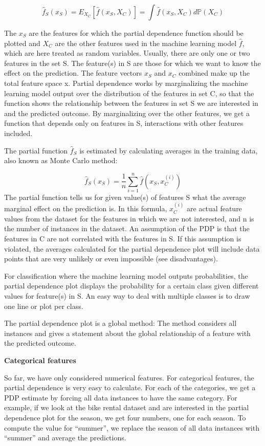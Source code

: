 \documentclass[
  10pt,
]{scrbook}
\begin{document}
\[\hat{f}_S(x_S)=E_{X_C}\left[\hat{f}(x_S,X_C)\right]=\int\hat{f}(x_S,X_C)d\mathbb{P}(X_C)\]

The \(x_S\) are the features for which the partial dependence function should be plotted and \(X_C\) are the other features used in the machine learning model \(\hat{f}\), which are here treated as random variables.
Usually, there are only one or two features in the set S.
The feature(s) in S are those for which we want to know the effect on the prediction.
The feature vectors \(x_S\) and \(x_C\) combined make up the total feature space x.
Partial dependence works by marginalizing the machine learning model output over the distribution of the features in set C, so that the function shows the relationship between the features in set S we are interested in and the predicted outcome.
By marginalizing over the other features, we get a function that depends only on features in S, interactions with other features included.

The partial function \(\hat{f}_S\) is estimated by calculating averages in the training data, also known as Monte Carlo method:

\[\hat{f}_S(x_S)=\frac{1}{n}\sum_{i=1}^n\hat{f}(x_S,x^{(i)}_{C})\]
The partial function tells us for given value(s) of features S what the average marginal effect on the prediction is.
In this formula, \(x^{(i)}_{C}\) are actual feature values from the dataset for the features in which we are not interested, and n is the number of instances in the dataset.
An assumption of the PDP is that the features in C are not correlated with the features in S.
If this assumption is violated, the averages calculated for the partial dependence plot will include data points that are very unlikely or even impossible (see disadvantages).

For classification where the machine learning model outputs probabilities, the partial dependence plot displays the probability for a certain class given different values for feature(s) in S.
An easy way to deal with multiple classes is to draw one line or plot per class.

The partial dependence plot is a global method:
The method considers all instances and gives a statement about the global relationship of a feature with the predicted outcome.

\textbf{Categorical features}

So far, we have only considered numerical features.
For categorical features, the partial dependence is very easy to calculate.
For each of the categories, we get a PDP estimate by forcing all data instances to have the same category.
For example, if we look at the bike rental dataset and are interested in the partial dependence plot for the season, we get four numbers, one for each season.
To compute the value for ``summer'', we replace the season of all data instances with ``summer'' and average the predictions.
\end{document}

